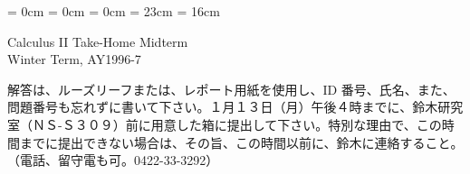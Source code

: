 

\topmargin = 0cm
\oddsidemargin = 0cm \evensidemargin = 0cm
\textheight = 23cm \textwidth = 16cm

\pagestyle{empty}


\begin{center}
{\gt\LARGE Calculus II  Take-Home Midterm}\\
{\gt Winter Term, AY1996-7}
\end{center}

\bigskip
\noindent
解答は、ルーズリーフまたは、レポート用紙を使用し、ID 番号、氏名、また、問題番号も忘れずに書いて下さい。１月１３日（月）午後４時までに、鈴木研究室（ＮＳ-Ｓ３０９）前に用意した箱に提出して下さい。特別な理由で、この時間までに提出できない場合は、その旨、この時間以前に、鈴木に連絡すること。（電話、留守電も可。0422-33-3292）

